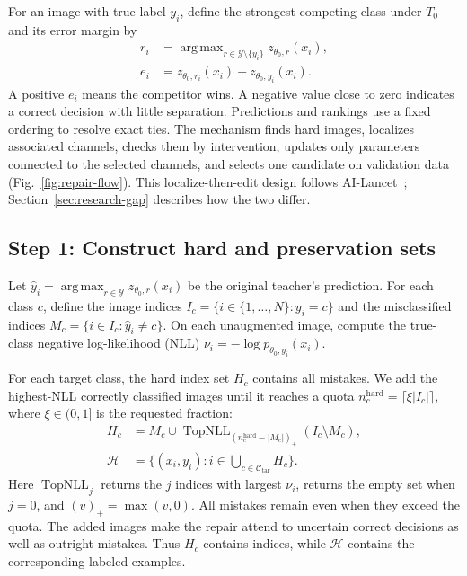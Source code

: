 \documentclass[review,number,sort&compress]{elsarticle}
\theoremstyle{definition}
\DeclareMathOperator*{\argmax}{arg\,max}
\begin{document}
For an image with true label $y_i$, define the strongest
competing class under $T_0$ and its error margin by
\begin{equation}
\label{eq:repair-error-margin}
\begin{aligned}
r_i&=\argmax_{r\in\mathcal{Y}\setminus\{y_i\}}
                 z_{\theta_0,r}(x_i),\\
e_i&=z_{\theta_0,r_i}(x_i)-z_{\theta_0,y_i}(x_i).
\end{aligned}
\end{equation}
A positive $e_i$ means the competitor wins. A negative value
close to zero indicates a correct decision with little
separation. Predictions and rankings use a fixed ordering
to resolve exact ties. The mechanism finds hard images,
localizes associated channels, checks them by intervention,
updates only parameters connected to the selected channels,
and selects one candidate on validation data
(Fig.~\ref{fig:repair-flow}). This
localize-then-edit design follows AI-Lancet~\citep{zhao2021ailancet};
Section~\ref{sec:research-gap} describes how the two differ.
\subsection{Step 1: Construct hard and preservation sets}

Let $\widehat y_i=\argmax_{r\in\mathcal{Y}}
z_{\theta_0,r}(x_i)$ be the original teacher's prediction.
For each class $c$, define the image indices
$I_c=\{i\in\{1,\ldots,N\}:y_i=c\}$ and the misclassified
indices $M_c=\{i\in I_c:\widehat y_i\ne c\}$.
On each unaugmented image, compute the true-class negative
log-likelihood (NLL)
$\nu_i=-\log p_{\theta_0,y_i}(x_i)$.

For each target class, the hard index set $H_c$ contains
all mistakes. We add the highest-NLL correctly classified
images until it reaches a quota
$n_c^{\mathrm{hard}}=\lceil\xi|I_c|\rceil$, where
$\xi\in(0,1]$ is the requested fraction:
\begin{equation}
\label{eq:repair-hard-set}
\begin{aligned}
H_c&=M_c\cup
\operatorname{TopNLL}_{(n_c^{\mathrm{hard}}-|M_c|)_+}
       (I_c\setminus M_c),\\
\mathcal{H}&=\{(x_i,y_i):i\in
          \bigcup_{c\in\mathcal{C}_{\mathrm{tar}}}H_c\}.
\end{aligned}
\end{equation}
Here $\operatorname{TopNLL}_j$ returns the $j$ indices with
largest $\nu_i$, returns the empty set when $j=0$, and
$(v)_+=\max(v,0)$. All mistakes remain even when they exceed
the quota. The added images make the repair attend to
uncertain correct decisions as well as outright mistakes.
Thus $H_c$ contains indices, while $\mathcal{H}$ contains
the corresponding labeled examples.
\end{document}
